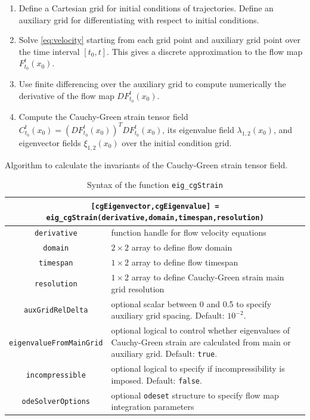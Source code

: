 \documentclass{elsarticle}
\begin{document}
\begin{table}
\begin{enumerate}
\item Define a Cartesian grid for initial conditions of trajectories. Define an auxiliary grid for differentiating with respect to initial conditions.
\item Solve \cref{eq:velocity} starting from each grid point and auxiliary grid point over the time interval $[t_0,t]$. This gives a discrete approximation to the flow map $F_{t_0}^t(x_0)$.
\item Use finite differencing over the auxiliary grid to compute numerically the derivative of the flow map $DF_{t_0}^t(x_0)$.
\item Compute the Cauchy-Green strain tensor field $C_{t_0}^t(x_0) = \left(DF_{t_0}^t(x_0)\right)^T DF_{t_0}^t(x_0)$, its eigenvalue field $\lambda_{1,2}(x_0)$, and eigenvector fields $\xi_{1,2}(x_0)$ over the initial condition grid.
\end{enumerate}
\caption{Algorithm to calculate the invariants of the Cauchy-Green strain tensor field.}
\label{t:Cauchy-Green algorithm}
\end{table}

\begin{table}
\begin{center}
\begin{tabular}{|c|p{}|}
\hline
\multicolumn{2}{|p{\textwidth}|}{\lstinline![cgEigenvector,cgEigenvalue] = eig_cgStrain(derivative,domain,timespan,resolution)!}\tabularnewline
\hline
\lstinline!derivative! & function handle for flow velocity equations\tabularnewline
\hline
\lstinline!domain! & $2 \times 2$ array to define flow domain\tabularnewline
\hline
\lstinline!timespan! & $1 \times 2$ array to define flow timespan\tabularnewline
\hline
\lstinline!resolution! & $1 \times 2$ array to define Cauchy-Green strain main grid resolution\tabularnewline
\hline
\lstinline!auxGridRelDelta! & optional scalar between 0 and 0.5 to specify auxiliary grid spacing. Default: $10^{-2}$.\tabularnewline
\hline
\lstinline!eigenvalueFromMainGrid! & optional logical to control whether eigenvalues of Cauchy-Green strain are calculated from main or auxiliary grid. Default: \lstinline!true!.\tabularnewline
\hline
\lstinline!incompressible! & optional logical to specify if incompressibility is imposed. Default: \lstinline!false!.\tabularnewline
\hline
\lstinline!odeSolverOptions! & optional \lstinline!odeset! structure to specify flow map integration parameters\tabularnewline
\hline
\end{tabular}
\caption{Syntax of the function \lstinline!eig_cgStrain!}
\label{t:eig_cgStrain syntax}
\end{center}
\end{table}
\end{document}
